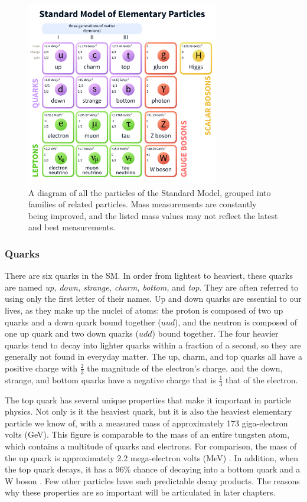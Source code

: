 \begin{figure}[h]
  \centering
  \includegraphics[width=0.75\textwidth]{figures/standard-model-light.pdf}
  \caption%
  {A diagram of all the particles of the Standard Model, grouped into
  families of related particles. Mass measurements are constantly
  being improved, and the listed mass values may not reflect the latest and
  best measurements.}
  \label{fig:standardmodel}
\end{figure}

\subsubsection*{Quarks}
There are six quarks in the SM. In order from lightest to heaviest,
these quarks are named \emph{up, down, strange, charm, bottom,} and
\emph{top}. They are often referred to using only the first letter of
their names. Up and down quarks are essential to our lives, as
they make up the nuclei of atoms: the proton is composed of two up
quarks and a down quark bound together ($uud$), and the neutron is composed of one up
quark and two down quarks ($udd$) bound together. The four heavier
quarks tend to decay into lighter quarks within a fraction of a
second, so they are generally not found in everyday matter. The up,
charm, and top quarks all have a positive charge with $\frac{2}{3}$ the
magnitude of the electron's charge, and the down, strange, and bottom
quarks have a negative charge that is $\frac{1}{3}$ that of the electron.

The top quark has several unique properties that make it important
in particle physics. Not only is
it the heaviest quark, but it is also the heaviest elementary particle
we know of, with a measured mass of approximately 173 giga-electron
volts (GeV). This figure is comparable to the mass
of an entire tungsten atom, which contains a multitude of quarks and
electrons. For comparison, the mass of the up quark is approximately
2.2 mega-electron volts (MeV) \cite{pdg}.
In addition, when the top quark decays, it has a 96\% chance of
decaying into a bottom quark and a W boson \cite{pdg}. Few other
particles have such predictable decay products. The reasons why these
properties are so important will be articulated in later chapters. %

